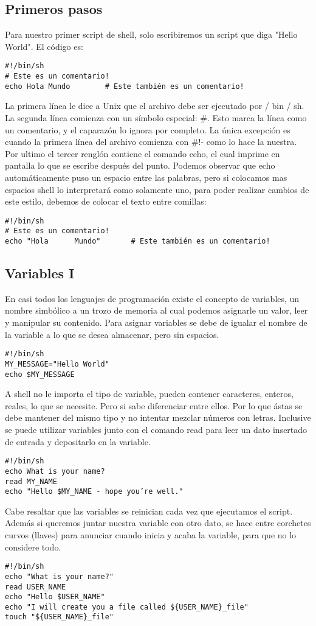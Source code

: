\documentclass{article}
\begin{document}
\begin{itemize}
\subsection*{Primeros pasos}
Para nuestro primer script de shell, solo escribiremos un script que diga "Hello World". El código es:
\begin{verbatim}
#!/bin/sh
# Este es un comentario!
echo Hola Mundo        # Este también es un comentario!
\end{verbatim}
La primera línea le dice a Unix que el archivo debe ser ejecutado por / bin / sh. La segunda línea comienza con un símbolo especial: \#. Esto marca la línea como un comentario, y el caparazón lo ignora por completo. La única excepción es cuando la primera línea del archivo comienza con \#!- como lo hace la nuestra.
Por ultimo el tercer renglón contiene el comando echo, el cual imprime en  pantalla lo que se escribe después del punto.
Podemos observar que echo automáticamente puso un espacio entre las palabras, pero si colocamos mas espacios shell lo interpretará como solamente uno, para poder realizar cambios de este estilo, debemos de colocar el texto entre comillas:
\begin{verbatim}
#!/bin/sh
# Este es un comentario!
echo "Hola      Mundo"       # Este también es un comentario!
\end{verbatim}

\subsection*{Variables I}
En casi todos los lenguajes de programación existe el concepto de variables, un nombre simbólico a un trozo de memoria al cual podemos asignarle un valor, leer y manipular su contenido. Para asignar variables se debe de igualar el nombre de la variable a lo que se desea almacenar, pero sin espacios.
\begin{verbatim}
#!/bin/sh
MY_MESSAGE="Hello World"
echo $MY_MESSAGE
\end{verbatim}
A shell no le importa el tipo de variable, pueden contener caracteres, enteros, reales, lo que se necesite. Pero si sabe diferenciar entre ellos. Por lo que ástas se debe mantener del mismo tipo y no intentar mezclar números con letras. Inclusive se puede utilizar variables junto con el comando read para leer un dato insertado de entrada y depositarlo en la variable.
\begin{verbatim}
#!/bin/sh
echo What is your name?
read MY_NAME
echo "Hello $MY_NAME - hope you’re well."
\end{verbatim}
Cabe resaltar que las variables se reinician cada vez que ejecutamos el script. Además si queremos juntar nuestra variable con otro dato, se hace entre corchetes curvos (llaves) para anunciar cuando inicia y acaba la variable, para que no lo considere todo.
\begin{verbatim}
#!/bin/sh
echo "What is your name?"
read USER_NAME
echo "Hello $USER_NAME"
echo "I will create you a file called ${USER_NAME}_file"
touch "${USER_NAME}_file"
\end{verbatim}

\end{itemize}
\end{document}
